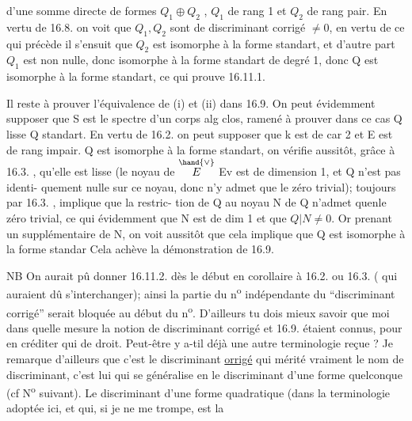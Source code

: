 
d'une somme directe de formes $Q_1 \oplus Q_2$ , $Q_1$ de rang 1 et $Q_2$ de rang pair.
En vertu de 16.8. on voit que $Q_1,Q_2$ sont de discriminant corrigé
$\neq 0$, en vertu de ce qui précède il s'ensuit que $Q_2$ est isomorphe à la
forme standart, et d'autre part $Q_1$ est non nulle, donc isomorphe à la
forme standart de degré 1, donc Q est isomorphe à la forme standart, ce
qui prouve 16.11.1.

Il reste à prouver l'équivalence de (i) et (ii) dans 16.9. On peut
évidemment supposer que S est le spectre d'un corps alg clos,  
ramené à prouver dans ce cas   Q lisse \hand{$\Longleftrightarrow$} Q standart.
En vertu de 16.2. on peut supposer que k est de car 2 et E est de rang
impair.   Q est isomorphe à la forme
standart,  on vérifie aussitôt, grâce à 16.3. , qu'elle
est lisse (le noyau de $\overset{\hand{\vee}}{E}$ \hand{$\longrightarrow$}Ev est de dimension 1, et Q n'est pas identi-%
quement nulle sur ce noyau, donc n'y admet que le zéro trivial); 
  toujours par 16.3. ,   implique que  la restric-%
tion de Q au noyau N de Q n'admet quenle zéro trivial, ce qui évidemment
  que N est de dim 1 et que $Q|N \neq 0$. Or prenant un supplémentaire
de N, on voit aussitôt que cela implique que Q est isomorphe à la forme
standar\hand{/} Cela  achève la démonstration de 16.9.

NB On aurait pû donner 16.11.2. dès le début en corollaire à
16.2. ou 16.3. ( qui auraient dû s'interchanger); ainsi la partie du n\textsuperscript{o}
indépendante du ``discriminant corrigé'' serait bloquée au début du n\textsuperscript{o}.
D'ailleurs tu dois mieux savoir que moi dans quelle mesure la notion
de discriminant corrigé et 16.9. étaient connus, pour en créditer qui de
droit. Peut-être y a-t\hand{\unsure{-}}il déjà une autre terminologie reçue ? Je remarque
d'ailleurs que c'est le discriminant \uline{orrigé} qui mérité vraiment le nom
de discriminant, c'est lui qui se généralise en le discriminant d'une
forme quelconque (cf N\textsuperscript{o} suivant). Le discriminant d'une forme quadratique
(dans la terminologie adoptée ici, et qui, si je ne me trompe, est la

